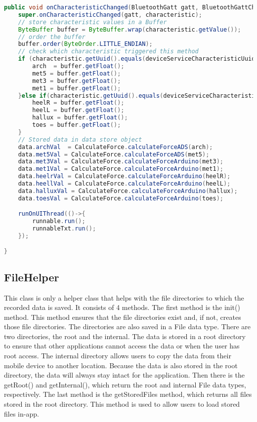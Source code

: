 \begin{lstlisting}[language=java,caption=onCharacteristicChanged() method, label=oncharchanged]
  public void onCharacteristicChanged(BluetoothGatt gatt, BluetoothGattCharacteristic characteristic) {
    super.onCharacteristicChanged(gatt, characteristic);
    // store characteristic values in a Buffer
    ByteBuffer buffer = ByteBuffer.wrap(characteristic.getValue()); 
    // order the buffer
    buffer.order(ByteOrder.LITTLE_ENDIAN);
    // check which characteristic triggered this method
    if (characteristic.getUuid().equals(deviceServiceCharacteristicUuid1)) {
        arch  = buffer.getFloat();
        met5 = buffer.getFloat();
        met3 = buffer.getFloat();
        met1 = buffer.getFloat();
    }else if(characteristic.getUuid().equals(deviceServiceCharacteristicUuid2)){
        heelR = buffer.getFloat();
        heelL = buffer.getFloat();
        hallux = buffer.getFloat();
        toes = buffer.getFloat();
    }
    // Stored data in data store object
    data.archVal  = CalculateForce.calculateForceADS(arch);
    data.met5Val = CalculateForce.calculateForceADS(met5);
    data.met3Val = CalculateForce.calculateForceArduino(met3);
    data.met1Val = CalculateForce.calculateForceArduino(met1);
    data.heelrVal = CalculateForce.calculateForceArduino(heelR);
    data.heellVal = CalculateForce.calculateForceArduino(heelL);
    data.halluxVal = CalculateForce.calculateForceArduino(hallux);
    data.toesVal = CalculateForce.calculateForceArduino(toes);

    runOnUIThread(()->{
        runnable.run();
        runnableTxt.run();
    });

}
\end{lstlisting}
\clearpage
\subsection{FileHelper}
This class is only a helper class that helps with the file directories to which the recorded data is saved. It consists of 4 methods. The first method is the init() method. This method ensures that the file directories exist and, if not, creates those file directories. The directories are also saved in a File data type. There are two directories, the root and the internal. The data is stored in a root directory to ensure that other applications cannot access the data or when the user has root access. The internal directory allows users to copy the data from their mobile device to another location. Because the data is also stored in the root directory, the data will always stay intact for the application. Then there is the getRoot() and getInternal(), which return the root and internal File data types, respectively. The last method is the getStoredFiles method, which returns all files stored in the root directory. This method is used to allow users to load stored files in-app.

